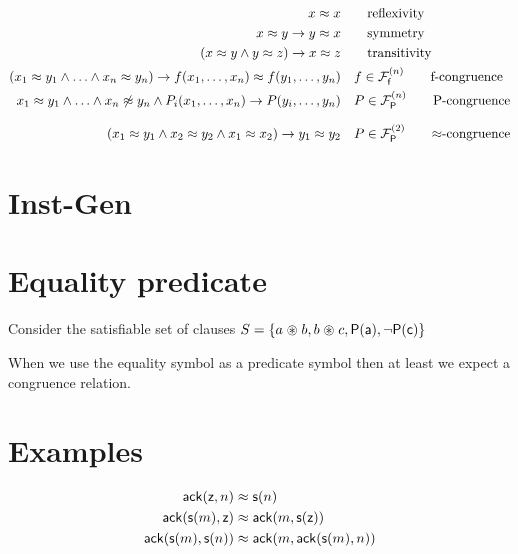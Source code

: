 \begin{align*}
	x \mEQ x & \tag*{reflexivity} 
	\\
	x \mEQ y \limp y \mEQ x & \tag*{symmetry}
	\\
	(x\mEQ y\land y\mEQ z)\limp x\mEQ z & \tag*{transitivity} 
	\\
	(x_1 \mEQ y_1\land\ldots\land x_n \mEQ y_n)\limp f(x_1,\ldots,x_n)\mEQ f(y_1,\ldots,y_n) &\quad f\in\mcFfn
	\tag*{f-congruence}
	\\
	x_1\mEQ y_1\land\ldots\land x_n\mNE y_n\land P_i(x_1,\ldots,x_n)
	\limp P(y_i,\ldots,y_n) &\quad P\in\mcFPn
	\tag*{P-congruence}
	\\[0.7em]
	(x_1\mEQ y_1
	\land x_2\mEQ y_2
	\land x_1\mEQ x_2)
	\limp y_1\mEQ y_2
	& \quad P\in\mcFPn[2]
		\tag*{$\mEQ$-congruence}
\end{align*}
	
	



\section{Inst-Gen}

\section{Equality predicate}

Consider the satisfiable set of clauses $S = \{a \mathrel{\circledast} b, b \mathrel{\circledast} c, {\mathsf P}({\mathsf a}), \lnot {\mathsf P}({\mathsf c}) \}$

When we use the equality symbol as a predicate symbol 
then at least we expect a congruence relation.

\section{Examples}

\begin{example}
	\begin{align*}
	\mathsf{ack}({\mathsf z},n) &\approx {\mathsf s}(n) \\
	\mathsf{ack}({\mathsf s}(m),{\mathsf z}) &\approx \mathsf{ack}(m, {\mathsf s}({\mathsf z})) \\
	\mathsf{ack}({\mathsf s}(m),{\mathsf s}(n)) &\approx \mathsf{ack}(m, \mathsf{ack}({\mathsf s}(m),n))
	\end{align*}
\end{example}



